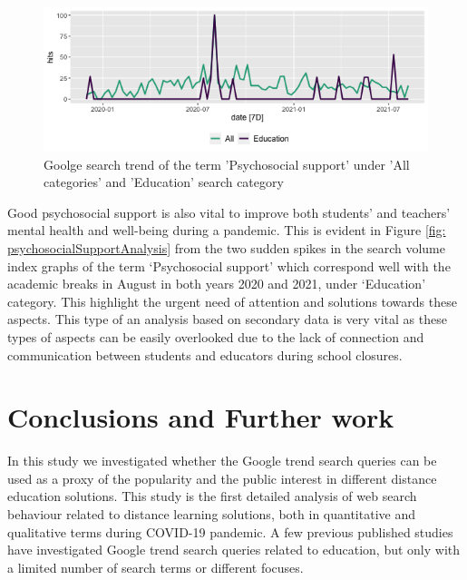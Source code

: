 \documentclass[11pt,a4paper,]{article}
\begin{document}
\begin{figure}[h]

{\centering \includegraphics[width=1\textwidth]{figure/psychosocialSupportAnalysis-1} 

}

\caption{Goolge search trend of the term 'Psychosocial support' under 'All categories' and 'Education' search category}\label{fig:psychosocialSupportAnalysis}
\end{figure}

Good psychosocial support is also vital to improve both students' and teachers' mental health and well-being during a pandemic. This is evident in Figure \ref{fig: psychosocialSupportAnalysis} from the two sudden spikes in the search volume index graphs of the term `Psychosocial support' which correspond well with the academic breaks in August in both years 2020 and 2021, under `Education' category. This highlight the urgent need of attention and solutions towards these aspects. This type of an analysis based on secondary data is very vital as these types of aspects can be easily overlooked due to the lack of connection and communication between students and educators during school closures.

\hypertarget{conclusions-and-further-work}{%
\section{Conclusions and Further work}\label{conclusions-and-further-work}}

In this study we investigated whether the Google trend search queries can be used as a proxy of the popularity and the public interest in different distance education solutions. This study is the first detailed analysis of web search behaviour related to distance learning solutions, both in quantitative and qualitative terms during COVID-19 pandemic. A few previous published studies \autocite{vaughan2014web,kansal2021google} have investigated Google trend search queries related to education, but only with a limited number of search terms or different focuses.
\end{document}
